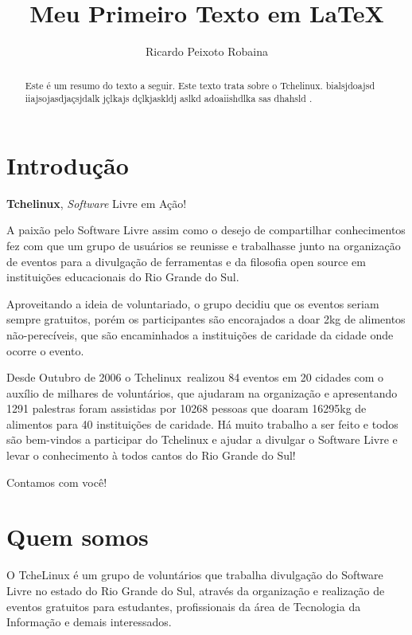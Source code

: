 \documentclass[conference]{IEEEtran}
\title{Meu Primeiro Texto em \LaTeX}
\author{Ricardo Peixoto Robaina}
\newcommand{\tl}{Tchelinux}
\begin{document}
	\maketitle
	
	
	\begin{abstract}
		Este é um resumo do texto a seguir. Este texto trata sobre o \tl. bialsjdoajsd iiajsojasdjaçsjdalk jçlkajs dçlkjaskldj aslkd adoaiishdlka sas dhahsld .
	\end{abstract}
	
	
	\section{Introdução}
	
		\textbf{Tchelinux}, \textit{Software}               Livre em Ação!
		
		A paixão pelo Software Livre assim como o desejo de compartilhar conhecimentos fez com que um grupo de usuários se reunisse e trabalhasse junto na organização de eventos para a divulgação de ferramentas e da filosofia open source em instituições educacionais do Rio Grande do Sul. 
		
		Aproveitando a ideia de voluntariado, o grupo decidiu que os eventos seriam sempre gratuitos, porém os participantes são encorajados a doar 2kg de alimentos não-perecíveis, que são encaminhados a instituições de caridade da cidade onde ocorre o evento.
		
		Desde Outubro de 2006 o \tl\ realizou 84 eventos em 20 cidades com o auxílio de milhares de voluntários, que ajudaram na organização e apresentando 1291 palestras foram assistidas por 10268 pessoas que doaram 16295kg de alimentos para 40 instituições de caridade. 
		Há muito trabalho a ser feito e todos são bem-vindos a participar do Tchelinux e ajudar a divulgar o Software Livre e levar o conhecimento à todos cantos do Rio Grande do Sul! 
		
		Contamos com você! 
		
	\section{Quem somos}
		
		O TcheLinux é um grupo de voluntários que trabalha divulgação do Software Livre no estado do Rio Grande do Sul, através da organização e realização de eventos gratuitos para estudantes, profissionais da área de Tecnologia da Informação e demais interessados.
		
\end{document}
